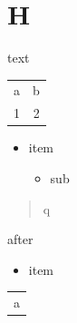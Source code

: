 \documentclass[11pt]{article}
\author{root}
\date{\today}
\title{}
\begin{document}
\tableofcontents

\section{H}
\label{sec:org61802d1}
text
\begin{center}
\begin{tabular}{rr}
a & b\\[0pt]
1 & 2\\[0pt]
\end{tabular}
\end{center}

\begin{itemize}
\item item
\begin{itemize}
\item sub
\end{itemize}
\end{itemize}

\begin{quote}
q
\end{quote}
after
\begin{itemize}
\item item
\end{itemize}
\begin{center}
\begin{tabular}{l}
a\\[0pt]
\end{tabular}
\end{center}
\end{document}
